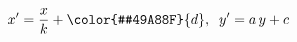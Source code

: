 \documentclass[preview]{standalone}
\begin{document}
\begin{align*}
x'=\frac{x}{k}+\color{#49A88F}{d},\;\;y'=a\,y+c
\end{align*}
\end{document}
